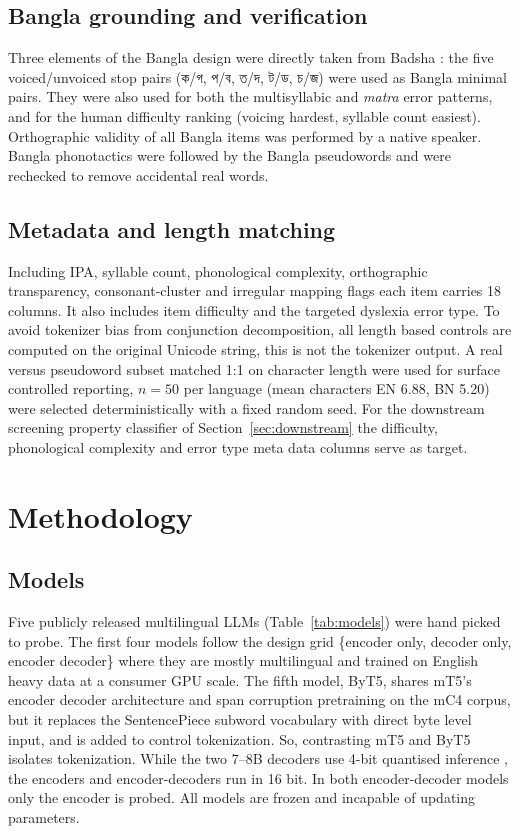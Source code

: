 \documentclass[preprint,12pt]{elsarticle}
\newcommand{\bn}[1]{{\banglafont #1}}
\begin{document}
\subsection{Bangla grounding and verification}
Three elements of the Bangla design were directly taken from Badsha \cite{badsha2024mall}: the five voiced/unvoiced stop pairs (\bn{ক/গ}, \bn{প/ব}, \bn{ত/দ}, \bn{ট/ড}, \bn{চ/জ}) were used as Bangla minimal pairs. They were also used for both the multisyllabic and \textit{matra} error patterns, and for the human difficulty ranking (voicing hardest, syllable count easiest). Orthographic validity of all Bangla items was performed by a native speaker. Bangla phonotactics were followed by the Bangla pseudowords and were rechecked to remove accidental real words.

\subsection{Metadata and length matching}
Including IPA, syllable count, phonological complexity, orthographic transparency, consonant-cluster and irregular mapping flags each item carries 18 columns. It also includes item difficulty and the targeted dyslexia error type. To avoid tokenizer bias from conjunction decomposition, all length based controls are computed on the original Unicode string, this is not the tokenizer output. A real versus pseudoword subset matched 1:1 on character length were used for surface controlled reporting, $n=50$ per language (mean characters EN 6.88, BN 5.20) were selected deterministically with a fixed random seed. For the downstream screening property classifier of Section~\ref{sec:downstream} the difficulty, phonological complexity and error type meta data columns serve as target.

\section{Methodology}
\label{sec:method}

\subsection{Models}
Five publicly released multilingual LLMs (Table~\ref{tab:models}) were hand picked to probe. The first four models follow the design grid \{encoder only, decoder only, encoder decoder\} where they are mostly multilingual and trained on English heavy data at a consumer GPU scale. The fifth model, ByT5, shares mT5's encoder decoder architecture and span corruption pretraining on the mC4 corpus, but it replaces the SentencePiece subword vocabulary with direct byte level input, and is added to control tokenization. So, contrasting mT5 and ByT5 isolates tokenization. While the two 7--8B decoders use 4-bit quantised inference \cite{dettmers2022bnb,dettmers2023qlora}, the encoders and encoder-decoders run in 16 bit. In both encoder-decoder models only the encoder is probed. All models are frozen and incapable of updating parameters.
\end{document}
